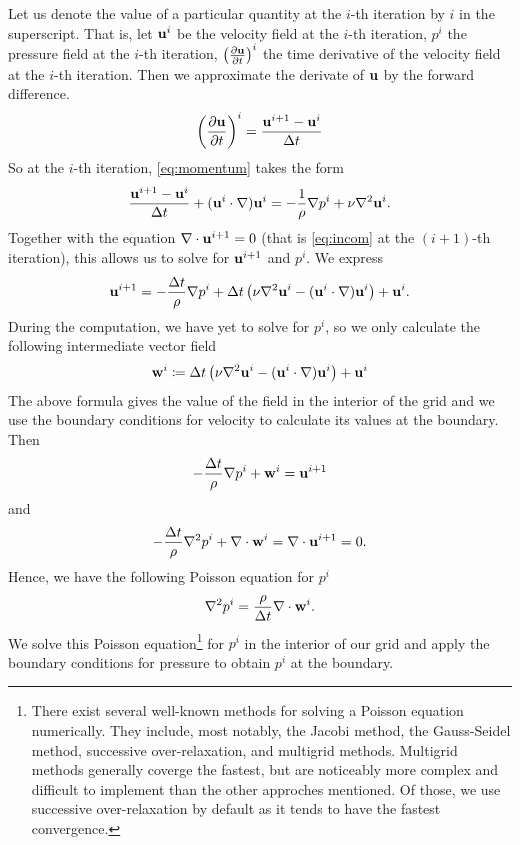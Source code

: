\documentclass[11pt,a4paper,twoside,openright]{report}
\begin{document}
Let us denote the value of a particular quantity at the $i$-th iteration by $i$ in the superscript. That is, let $\mathbf u^i$ be the velocity field at the $i$-th iteration, $p^i$ the pressure field at the $i$-th iteration, $\left(\frac{\partial \mathbf u}{\partial t}\right)^i$ the time derivative of the velocity field at the $i$-th iteration. Then we approximate the derivate of $\mathbf u$ by the forward difference.
\begin{align}
	\left(\frac{\partial \mathbf u}{\partial t}\right)^i=\frac{\mathbf u^{i+1}-\mathbf u^i}{\Delta t}
\end{align}
So at the $i$-th iteration, \eqref{eq:momentum} takes the form
\begin{align}
	\frac{\mathbf u^{i+1}-\mathbf u^i}{\Delta t}+(\mathbf u^i\cdot\nabla)\mathbf u^i=-\frac1\rho\nabla p^i+\nu\nabla^2\mathbf u^i.
\end{align}
Together with the equation $\nabla\cdot\mathbf u^{i+1}=0$ (that is \eqref{eq:incom} at the $(i+1)$-th iteration), this allows us to solve for $\mathbf u^{i+1}$ and $p^i$. We express
\begin{align}
	\mathbf u^{i+1}=-\frac{\Delta t}\rho\nabla p^i+\Delta t\left(\nu\nabla^2\mathbf u^i-(\mathbf u^i\cdot\nabla)\mathbf u^i\right)+\mathbf u^i.
\end{align}
During the computation, we have yet to solve for $p^i$, so we only calculate the following intermediate vector field
\newcommand{\ww}{\mathbf w}
\begin{align*}
	\ww^i\coloneqq\dt\left(\nu\nabla^2\uu^i-(\uu^i\cdot\nabla)\uu^i\right)+\uu^i
\end{align*}
The above formula gives the value of the field in the interior of the grid and we use the boundary conditions for velocity to calculate its values at the boundary. Then
\begin{align*}
	-\frac\dt\rho\nabla p^i+\ww^i=\uu^{i+1}
\end{align*}
and
\begin{align*}
	-\frac\dt\rho\nabla^2p^i+\nabla\cdot\ww^i=\nabla\cdot\uu^{i+1}=0.
\end{align*}
Hence, we have the following Poisson equation for $p^i$
\begin{align*}
	\nabla^2p^i=\frac\rho\dt\nabla\cdot\ww^i.
\end{align*}
We solve this Poisson equation\footnote{There exist several well-known methods for solving a Poisson equation numerically. They include, most notably, the Jacobi method, the Gauss-Seidel method, successive over-relaxation, and multigrid methods. Multigrid methods generally coverge the fastest, but are noticeably more complex and difficult to implement than the other approches mentioned. Of those, we use successive over-relaxation by default as it tends to have the fastest convergence.} for $p^i$ in the interior of our grid and apply the boundary conditions for pressure to obtain $p^i$ at the boundary.
\end{document}
